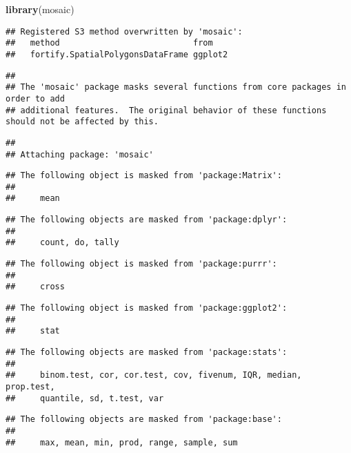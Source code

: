 \documentclass[
]{article}
\newenvironment{Shaded}{\begin{snugshade}}{\end{snugshade}}
\newcommand{\FunctionTok}[1]{\textcolor[rgb]{0.13,0.29,0.53}{\textbf{#1}}}
\newcommand{\NormalTok}[1]{#1}
\begin{document}
\begin{Shaded}
\begin{Highlighting}[]
\FunctionTok{library}\NormalTok{(mosaic)}
\end{Highlighting}
\end{Shaded}

\begin{verbatim}
## Registered S3 method overwritten by 'mosaic':
##   method                           from   
##   fortify.SpatialPolygonsDataFrame ggplot2
\end{verbatim}

\begin{verbatim}
## 
## The 'mosaic' package masks several functions from core packages in order to add 
## additional features.  The original behavior of these functions should not be affected by this.
\end{verbatim}

\begin{verbatim}
## 
## Attaching package: 'mosaic'
\end{verbatim}

\begin{verbatim}
## The following object is masked from 'package:Matrix':
## 
##     mean
\end{verbatim}

\begin{verbatim}
## The following objects are masked from 'package:dplyr':
## 
##     count, do, tally
\end{verbatim}

\begin{verbatim}
## The following object is masked from 'package:purrr':
## 
##     cross
\end{verbatim}

\begin{verbatim}
## The following object is masked from 'package:ggplot2':
## 
##     stat
\end{verbatim}

\begin{verbatim}
## The following objects are masked from 'package:stats':
## 
##     binom.test, cor, cor.test, cov, fivenum, IQR, median, prop.test,
##     quantile, sd, t.test, var
\end{verbatim}

\begin{verbatim}
## The following objects are masked from 'package:base':
## 
##     max, mean, min, prod, range, sample, sum
\end{verbatim}
\end{document}
